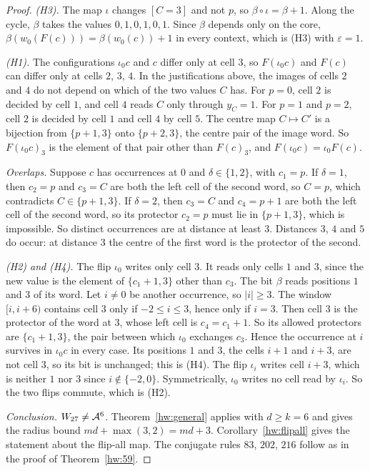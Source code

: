 \begin{proof}
\emph{(H3).} The map $\iota$ changes $[C=3]$ and not $p$, so $\beta\circ\iota=\beta+1$. Along the cycle, $\beta$ takes the values $0,1,0,1,0,1$. Since $\beta$ depends only on the core, $\beta(w_0(F(c)))=\beta(w_0(c))+1$ in every context, which is (H3) with $\varepsilon=1$.

\emph{(H1).} The configurations $\iota_0c$ and $c$ differ only at cell $3$, so $F(\iota_0c)$ and $F(c)$ can differ only at cells $2$, $3$, $4$. In the justifications above, the images of cells $2$ and $4$ do not depend on which of the two values $C$ has. For $p=0$, cell $2$ is decided by cell $1$, and cell $4$ reads $C$ only through $y_C=1$. For $p=1$ and $p=2$, cell $2$ is decided by cell $1$ and cell $4$ by cell $5$. The centre map $C\mapsto C'$ is a bijection from $\{p+1,3\}$ onto $\{p+2,3\}$, the centre pair of the image word. So $F(\iota_0c)_3$ is the element of that pair other than $F(c)_3$, and $F(\iota_0c)=\iota_0F(c)$.

\emph{Overlaps.} Suppose $c$ has occurrences at $0$ and $\delta\in\{1,2\}$, with $c_1=p$. If $\delta=1$, then $c_2=p$ and $c_3=C$ are both the left cell of the second word, so $C=p$, which contradicts $C\in\{p+1,3\}$. If $\delta=2$, then $c_3=C$ and $c_4=p+1$ are both the left cell of the second word, so its protector $c_2=p$ must lie in $\{p+1,3\}$, which is impossible. So distinct occurrences are at distance at least $3$. Distances $3$, $4$ and $5$ do occur: at distance $3$ the centre of the first word is the protector of the second.

\emph{(H2) and (H4).} The flip $\iota_0$ writes only cell $3$. It reads only cells $1$ and $3$, since the new value is the element of $\{c_1+1,3\}$ other than $c_3$. The bit $\beta$ reads positions $1$ and $3$ of its word. Let $i\ne0$ be another occurrence, so $|i|\ge3$. The window $[i,i+6)$ contains cell $3$ only if $-2\le i\le3$, hence only if $i=3$. Then cell $3$ is the protector of the word at $3$, whose left cell is $c_4=c_1+1$. So its allowed protectors are $\{c_1+1,3\}$, the pair between which $\iota_0$ exchanges $c_3$. Hence the occurrence at $i$ survives in $\iota_0c$ in every case. Its positions $1$ and $3$, the cells $i+1$ and $i+3$, are not cell $3$, so its bit is unchanged; this is (H4). The flip $\iota_i$ writes cell $i+3$, which is neither $1$ nor $3$ since $i\notin\{-2,0\}$. Symmetrically, $\iota_0$ writes no cell read by $\iota_i$. So the two flips commute, which is (H2).

\emph{Conclusion.} $W_{27}\ne\mathcal{A}^6$. Theorem~\ref{hw:general} applies with $d\ge k=6$ and gives the radius bound $md+\max(3,2)=md+3$. Corollary~\ref{hw:flipall} gives the statement about the flip-all map. The conjugate rules $83$, $202$, $216$ follow as in the proof of Theorem~\ref{hw:59}.
\end{proof}

